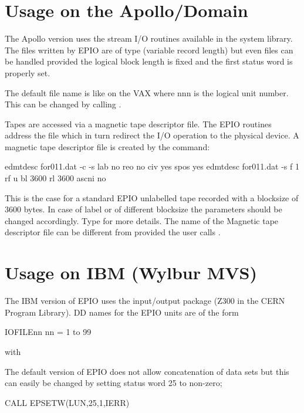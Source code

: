 \section{Usage on the Apollo/Domain}

The Apollo version uses the stream I/O routines available in
the system library. The files written by EPIO are of type  (variable
record length) but even  files can be handled provided the
logical block length is fixed and the first status word is properly set.
 
The default file name is  like on the VAX where nnn
is the logical unit number. 
This can be changed by calling .
 
Tapes are accessed via a magnetic tape descriptor file. The EPIO
routines address the file which in turn redirect the I/O operation to
the physical device. A magnetic tape descriptor file is created by
the command:

\begin{XMP}
   edmtdesc for011.dat -c -s lab no reo no civ yes spos yes
   edmtdesc for011.dat    -s f 1 rf u bl 3600 rl 3600 ascni no
\end{XMP}
 
This is the case for a standard EPIO unlabelled tape recorded with
a blocksize of 3600 bytes. In case of label or of different blocksize
the parameters should be changed accordingly. 
Type  for
more details. The name of the Magnetic tape descriptor file can
be different from  provided the user calls .
 
\section{Usage on IBM (Wylbur MVS)}

The IBM version of EPIO uses the input/output package 
(Z300 in the CERN Program Library).
DD names for the EPIO units are of the form
\begin{XMP} 
      IOFILEnn    nn = 1 to 99
\end{XMP} 
with  
 
The default version of EPIO does not allow concatenation of data sets
but this can easily be changed by setting status word 25 to non-zero;
\begin{XMP}
     CALL EPSETW(LUN,25,1,IERR)
\end{XMP}
 
